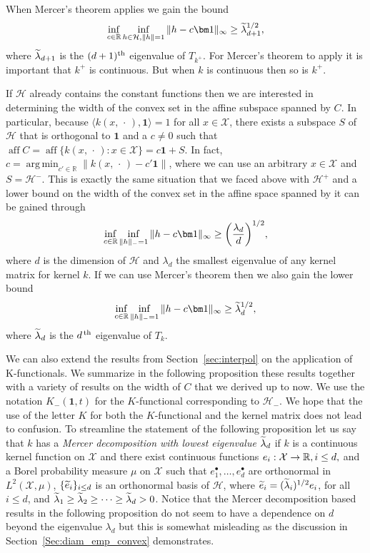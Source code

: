 \documentclass[AHL,Unicode,longabstracts,published]{cedram}
\theoremstyle{remark}
\DeclareMathOperator*{\argmin}{arg\,min}
\DeclareMathOperator{\aff}{aff}
\newcommand{\R}{\mathbb{R}}
\newcommand{\X}{\mathcal{X}}
\newcommand{\cH}{\mathcal{H}}
\let\oldtilde\tilde
\renewcommand*{\tilde}[1]{\mathchoice{\widetilde{#1}}{\widetilde{#1}}{\oldtilde{#1}}{\oldtilde{#1}}}
\renewcommand*{\to}{\mathchoice{\longrightarrow}{\rightarrow}{\rightarrow}{\rightarrow}}
\let\originalleft\left
\let\originalright\right
\renewcommand{\left}{\mathopen{}\mathclose\bgroup\originalleft}
\renewcommand{\right}{\aftergroup\egroup\originalright}
\begin{document}
When Mercer's theorem applies we gain the bound
\[
\inf_{c \in \R} \inf_{h \in \cH, \|h\|=1} \|h - c\bm 1\|_\infty \geq \tilde \lambda_{d+1}^{1/2},
\]
where $\tilde \lambda_{d+1}$ is the $(d+1)^{\rm th}$ eigenvalue of $T_{k^+}$. For Mercer's theorem to apply it is important that $k^+$ is continuous. But when $k$ is continuous then so is $k^+$.

If $\cH$ already contains the constant functions then we are interested in determining the width of the convex set in the affine subspace spanned by $C$. In particular, because $\langle k(x,\,\cdot\,), \bm 1 \rangle = 1$ for all $x \in \X$, there exists a subspace $S$ of $\cH$ that is orthogonal to $\bm 1$ and a $c \not = 0$ such that $\aff C = \aff \{k(x,\,\cdot\,) : x \in \X\} = c \bm 1 + S$. In fact, $c = \argmin_{c' \in \R} \| k(x,\,\cdot\,) - c' \bm 1\|$, where we can use an arbitrary $x \in \X$ and $S = \cH^-$. This is exactly the same situation that we faced above with $\cH^+$ and a lower bound on the width of the convex set in the affine space spanned by it can be gained through
\[
\inf_{c\in \R} \inf_{\|h\|_- = 1} \| h - c \bm 1 \|_\infty \geq \left(\frac{\lambda_d}{d} \right)^{1/2},
\]
\pagebreak{}
where $d$ is the dimension of $\cH$ and $\lambda_d$ the smallest eigenvalue of any kernel matrix for kernel $k$. If we can use Mercer's theorem then we also gain the lower bound
\[
\inf_{c \in \R} \inf_{\|h\|_- =1} \|h - c \bm 1 \|_\infty \geq \tilde \lambda_{d}^{1/2},
\]
where $\tilde \lambda_{d}$ is the $d^{\,\rm th}$ eigenvalue of $T_{k}$.


We can also extend the results from Section~\ref{sec:interpol} on the application of K-functionals. We summarize in the following proposition these results together with a variety of results on the width of $C$ that we derived up to now. We use the notation $K_-(\bm 1,t)$ for the $K$-functional corresponding to $\cH_-$. We hope that the use of the letter $K$ for both the $K$-functional and the kernel matrix does not lead to confusion. To streamline the statement of the following proposition let us say that $k$ has a \emph{Mercer decomposition with lowest eigenvalue $\tilde \lambda_d$} if $k$ is a continuous kernel function on $\X$ and there exist continuous functions $e_i: \X \to \R, i \leq d,$ and a Borel probability measure $\mu$ on $\X$ such that $e_1^\bullet,\dots, e_d^\bullet$ are orthonormal in $L^2(\X,\mu)$, $\{\tilde e_i\}_{i\leq d}$ is an orthonormal basis of $\cH$, where $\tilde e_i = (\tilde \lambda_i)^{1/2} e_i$, for all $i \leq d$, and $\tilde \lambda_1 \geq \tilde \lambda_2\geq \dots \geq \tilde \lambda_d>0$. Notice that the Mercer decomposition based results in the following proposition do not seem to have a dependence on $d$ beyond the eigenvalue $\lambda_d$ but this is somewhat misleading as the discussion in Section~\ref{Sec:diam_emp_convex} demonstrates.
\end{document}
